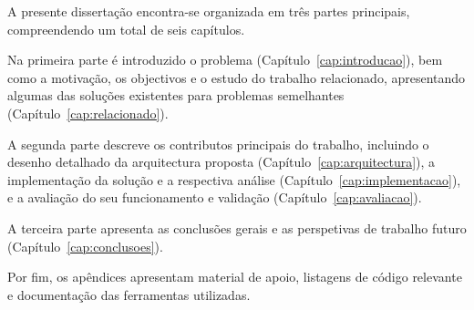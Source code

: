 A presente dissertação encontra-se organizada em três partes principais, compreendendo um total de seis capítulos.

Na primeira parte é introduzido o problema (Capítulo~\ref{cap:introducao}), bem como a motivação, os objectivos e o estudo do trabalho relacionado, apresentando algumas das soluções existentes para problemas semelhantes (Capítulo~\ref{cap:relacionado}).

A segunda parte descreve os contributos principais do trabalho, incluindo o desenho detalhado da arquitectura proposta (Capítulo~\ref{cap:arquitectura}), a implementação da solução e a respectiva análise (Capítulo~\ref{cap:implementacao}), e a avaliação do seu funcionamento e validação (Capítulo~\ref{cap:avaliacao}).

A terceira parte apresenta as conclusões gerais e as perspetivas de trabalho futuro (Capítulo~\ref{cap:conclusoes}).

Por fim, os apêndices apresentam material de apoio, listagens de código relevante e documentação das ferramentas utilizadas.
